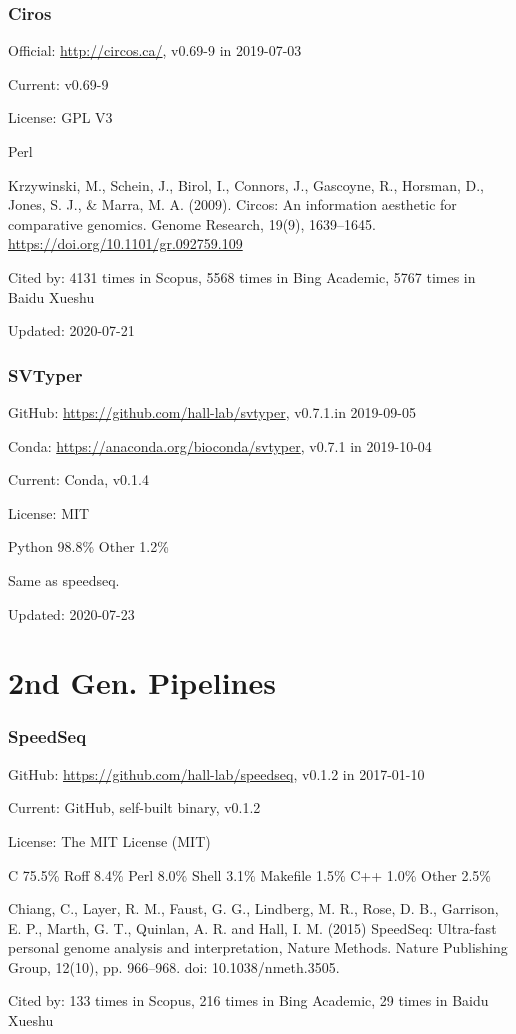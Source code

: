 \documentclass[]{article}
\newcommand{\cb}[3]{\par Cited by: {\color{blue}\Huge #1} times in Scopus, {\color{blue}\Huge #2} times in Bing Academic, {\color{blue}\Huge #3} times in Baidu Xueshu}
\begin{document}
\section{Ciros}

Official: \url{http://circos.ca/}, v0.69-9  in 2019-07-03

Current: v0.69-9

License: GPL V3

Perl

Krzywinski, M., Schein, J., Birol, I., Connors, J., Gascoyne, R., Horsman, D., Jones, S. J., \& Marra, M. A. (2009). Circos: An information aesthetic for comparative genomics. Genome Research, 19(9), 1639–1645. \url{https://doi.org/10.1101/gr.092759.109 }\cb{4131}{5568}{5767}

Updated: 2020-07-21

\section{SVTyper}

GitHub: \url{https://github.com/hall-lab/svtyper}, v0.7.1.in 2019-09-05

Conda: \url{https://anaconda.org/bioconda/svtyper}, v0.7.1 in 2019-10-04

Current: Conda, v0.1.4

License: MIT

Python 98.8\% Other 1.2\%

Same as speedseq.

Updated: 2020-07-23

\part{2nd Gen. Pipelines}
\section{SpeedSeq}

GitHub: \url{https://github.com/hall-lab/speedseq}, v0.1.2 in 2017-01-10

Current: GitHub, self-built binary, v0.1.2

License: The MIT License (MIT)

C 75.5\% Roff 8.4\% Perl 8.0\% Shell 3.1\% Makefile 1.5\% C++ 1.0\% Other 2.5\%

Chiang, C., Layer, R. M., Faust, G. G., Lindberg, M. R., Rose, D. B., Garrison, E. P., Marth, G. T., Quinlan, A. R. and Hall, I. M. (2015) SpeedSeq: Ultra-fast personal genome analysis and interpretation, Nature Methods. Nature Publishing Group, 12(10), pp. 966–968. doi: 10.1038/nmeth.3505.\cb{133}{216}{29}
\end{document}

